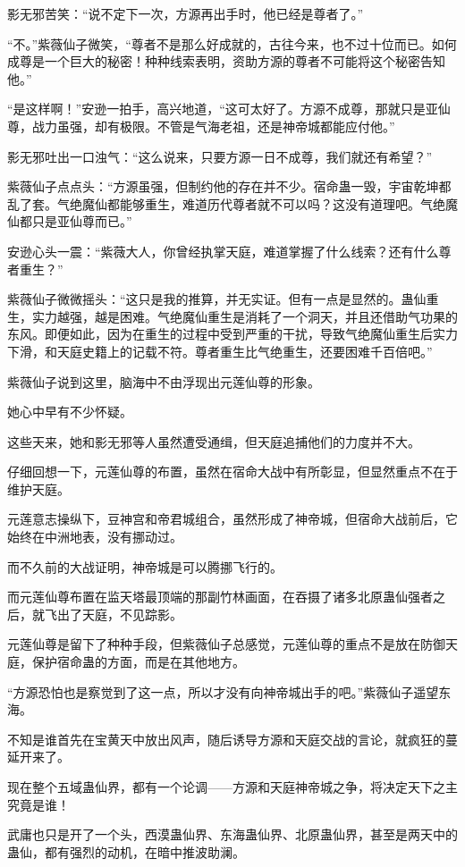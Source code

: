 \begin{this_body}
影无邪苦笑：“说不定下一次，方源再出手时，他已经是尊者了。”

“不。”紫薇仙子微笑，“尊者不是那么好成就的，古往今来，也不过十位而已。如何成尊是一个巨大的秘密！种种线索表明，资助方源的尊者不可能将这个秘密告知他。”

“是这样啊！”安逊一拍手，高兴地道，“这可太好了。方源不成尊，那就只是亚仙尊，战力虽强，却有极限。不管是气海老祖，还是神帝城都能应付他。”

影无邪吐出一口浊气：“这么说来，只要方源一日不成尊，我们就还有希望？”

紫薇仙子点点头：“方源虽强，但制约他的存在并不少。宿命蛊一毁，宇宙乾坤都乱了套。气绝魔仙都能够重生，难道历代尊者就不可以吗？这没有道理吧。气绝魔仙都只是亚仙尊而已。”

安逊心头一震：“紫薇大人，你曾经执掌天庭，难道掌握了什么线索？还有什么尊者重生？”

紫薇仙子微微摇头：“这只是我的推算，并无实证。但有一点是显然的。蛊仙重生，实力越强，越是困难。气绝魔仙重生是消耗了一个洞天，并且还借助气功果的东风。即便如此，因为在重生的过程中受到严重的干扰，导致气绝魔仙重生后实力下滑，和天庭史籍上的记载不符。尊者重生比气绝重生，还要困难千百倍吧。”

紫薇仙子说到这里，脑海中不由浮现出元莲仙尊的形象。

她心中早有不少怀疑。

这些天来，她和影无邪等人虽然遭受通缉，但天庭追捕他们的力度并不大。

仔细回想一下，元莲仙尊的布置，虽然在宿命大战中有所彰显，但显然重点不在于维护天庭。

元莲意志操纵下，豆神宫和帝君城组合，虽然形成了神帝城，但宿命大战前后，它始终在中洲地表，没有挪动过。

而不久前的大战证明，神帝城是可以腾挪飞行的。

而元莲仙尊布置在监天塔最顶端的那副竹林画面，在吞摄了诸多北原蛊仙强者之后，就飞出了天庭，不见踪影。

元莲仙尊是留下了种种手段，但紫薇仙子总感觉，元莲仙尊的重点不是放在防御天庭，保护宿命蛊的方面，而是在其他地方。

“方源恐怕也是察觉到了这一点，所以才没有向神帝城出手的吧。”紫薇仙子遥望东海。

不知是谁首先在宝黄天中放出风声，随后诱导方源和天庭交战的言论，就疯狂的蔓延开来了。

现在整个五域蛊仙界，都有一个论调——方源和天庭神帝城之争，将决定天下之主究竟是谁！

武庸也只是开了一个头，西漠蛊仙界、东海蛊仙界、北原蛊仙界，甚至是两天中的蛊仙，都有强烈的动机，在暗中推波助澜。


\end{this_body}
